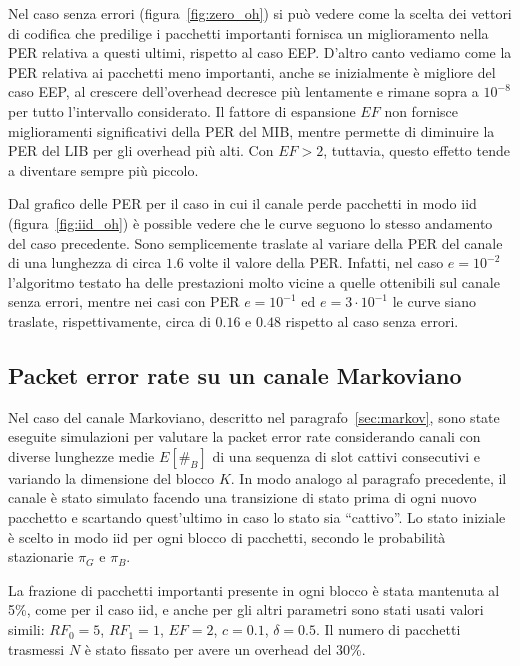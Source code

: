 \documentclass[italian, a4paper, 12pt]{article}
\begin{document}
Nel caso senza errori (figura~\ref{fig:zero_oh}) si può vedere come la
scelta dei vettori di codifica che predilige i pacchetti importanti
fornisca un miglioramento nella PER relativa a questi ultimi, rispetto
al caso EEP.
%
D'altro canto vediamo come la PER relativa ai pacchetti meno
importanti, anche se inizialmente è migliore del caso EEP, al crescere
dell'overhead decresce più lentamente e rimane sopra a $10^{-8}$ per
tutto l'intervallo considerato.
%
Il fattore di espansione $EF$ non fornisce miglioramenti significativi
della PER del MIB, mentre permette di diminuire la PER del LIB per gli
overhead più alti. Con $EF > 2$, tuttavia, questo effetto tende a
diventare sempre più piccolo.

Dal grafico delle PER per il caso in cui il canale perde pacchetti in
modo iid (figura~\ref{fig:iid_oh}) è possible vedere che le curve
seguono lo stesso andamento del caso precedente. Sono semplicemente
traslate al variare della PER del canale di una lunghezza di circa
$1.6$ volte il valore della PER.
%
Infatti, nel caso $e = 10^{-2}$ l'algoritmo testato ha delle
prestazioni molto vicine a quelle ottenibili sul canale senza errori,
mentre nei casi con PER $e = 10^{-1}$ ed $e = 3\cdot 10^{-1}$ le curve
siano traslate, rispettivamente, circa di $0.16$ e $0.48$ rispetto al
caso senza errori.

\subsection{Packet error rate su un canale Markoviano}
Nel caso del canale Markoviano, descritto nel
paragrafo~\ref{sec:markov}, sono state eseguite simulazioni per
valutare la packet error rate considerando canali con diverse
lunghezze medie $E[\#_B]$ di una sequenza di slot cattivi consecutivi
e variando la dimensione del blocco $K$.
%
In modo analogo al paragrafo precedente, il canale è stato simulato
facendo una transizione di stato prima di ogni nuovo pacchetto e
scartando quest'ultimo in caso lo stato sia ``cattivo''. Lo stato
iniziale è scelto in modo iid per ogni blocco di pacchetti, secondo le
probabilità stazionarie $\pi_G$ e $\pi_B$.

La frazione di pacchetti importanti presente in ogni blocco è stata
mantenuta al 5\%, come per il caso iid, e anche per gli altri
parametri sono stati usati valori simili: $RF_0 = 5$, $RF_1 = 1$,
$EF=2$, $c=0.1$, $\delta=0.5$. Il numero di pacchetti trasmessi $N$ è
stato fissato per avere un overhead del 30\%.
\end{document}
